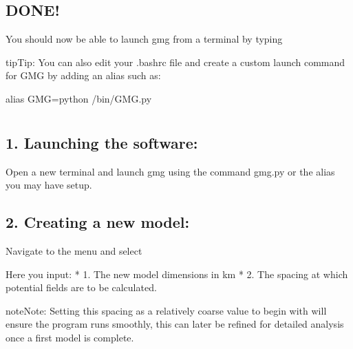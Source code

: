 \documentclass[a4paper,10pt,english]{sphinxmanual}
\begin{document}
\subsection{DONE!}
\label{\detokenize{installation:done}}
You should now be able to launch gmg from a terminal by typing 

\begin{sphinxadmonition}{tip}{Tip:}
You can also edit your .bashrc file and create a custom launch command for GMG by adding an alias such as:

%
\begin{sphinxVerbatim}[commandchars=\\\{\}]
alias GMG=\PYGZsq{}python /bin/GMG.py\PYGZsq{}
\end{sphinxVerbatim}
\end{sphinxadmonition}


\section{}
\label{\detokenize{getting_started:id1}}\label{\detokenize{getting_started:getting-started}}\label{\detokenize{getting_started::doc}}

\subsection{1. Launching the software:}
\label{\detokenize{getting_started:launching-the-software}}
Open a new terminal and launch gmg using the command gmg.py or the alias you may have setup.


\subsection{2. Creating a new model:}
\label{\detokenize{getting_started:creating-a-new-model}}
Navigate to the  menu and select 

Here you input:
* 1. The new model dimensions in km
* 2. The spacing at which potential fields are to be calculated.

\begin{sphinxadmonition}{note}{Note:}
Setting this spacing as a relatively coarse value to begin with will ensure the program runs smoothly,
this can later be refined for detailed analysis once a first model is complete.
\end{sphinxadmonition}
\end{document}
